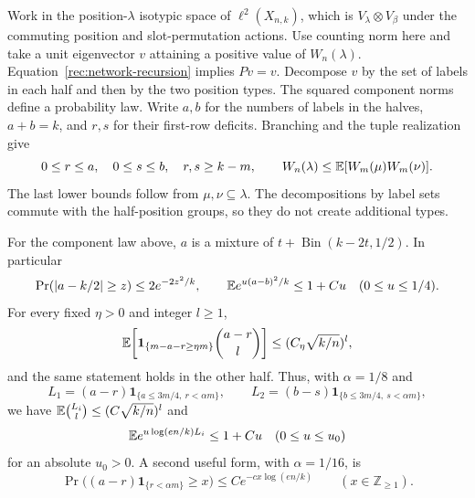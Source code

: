 Work in the position-$\lambda$ isotypic space of $\ell^2(X_{n,k})$,
which is $V_\lambda\otimes V_\beta$ under the commuting position and
slot-permutation actions.  Use counting norm here and take a unit
eigenvector $v$ attaining a
positive value of $W_n(\lambda)$.
Equation~\eqref{rec:network-recursion} implies $Pv=v$.  Decompose $v$
by the set of labels in each half and then by the two position types.
The squared component norms define a probability law.  Write $a,b$ for
the numbers of labels in the halves, $a+b=k$, and $r,s$ for their first-row
deficits.  Branching and the tuple realization give
\begin{equation}\label{rec:restriction-law}
 0\le r\le a,\quad 0\le s\le b,\quad r,s\ge k-m,
 \qquad W_n(\lambda)\le\mathbb E[W_m(\mu)W_m(\nu)].
\end{equation}
The last lower bounds follow from $\mu,\nu\subseteq\lambda$.
The decompositions by label sets commute with the half-position groups,
so they do not create additional types.

\begin{lemma}\label{rec:removal-splitting}
For the component law above, $a$ is a mixture of
$t+\operatorname{Bin}(k-2t,1/2)$.  In particular
\begin{equation}\label{rec:split-tail}
 \Pr(|a-k/2|\ge z)\le2e^{-2z^2/k},\qquad
 \mathbb E e^{u(a-b)^2/k}\le1+Cu\quad(0\le u\le1/4).
\end{equation}
For every fixed $\eta>0$ and integer $l\ge1$,
\begin{equation}\label{rec:loss-binomial-general}
 \mathbb E\!\left[\mathbf1_{\{m-a-r\ge\eta m\}}
                   {a-r\choose l}\right]
       \le(C_\eta\sqrt{k/n})^l,
\end{equation}
and the same statement holds in the other half.  Thus, with
$\alpha=1/8$ and
\[
 L_1=(a-r)\mathbf1_{\{a\le3m/4,\ r<\alpha m\}},\qquad
 L_2=(b-s)\mathbf1_{\{b\le3m/4,\ s<\alpha m\}},
\]
we have $\mathbb E{L_i\choose l}\le(C\sqrt{k/n})^l$ and
\begin{equation}\label{rec:loss-mgf}
 \mathbb E e^{u\log(en/k)L_i}\le1+Cu
 \quad(0\le u\le u_0)
\end{equation}
for an absolute $u_0>0$.  A second useful form, with $\alpha=1/16$, is
\begin{equation}\label{rec:loss-tail}
 \Pr\big((a-r)\mathbf1_{\{r<\alpha m\}}\ge x\big)
       \le C e^{-cx\log(en/k)}\qquad(x\in\mathbb Z_{\ge1}).
\end{equation}
\end{lemma}

